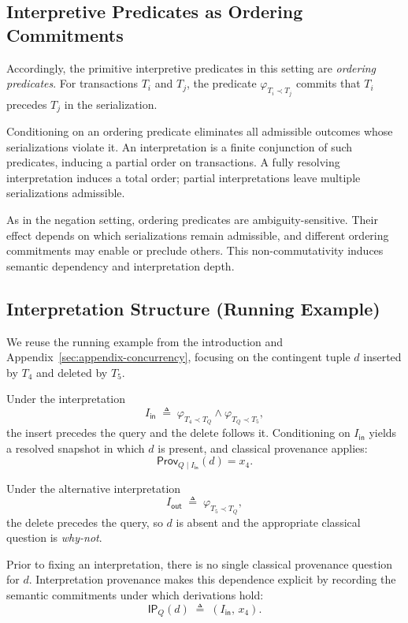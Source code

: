 \documentclass[acmsmall,nonacm]{acmart}
\theoremstyle{remark}
\numberwithin{definition}{section}
\numberwithin{theorem}{section}
\numberwithin{lemma}{section}
\numberwithin{corollary}{section}
\numberwithin{remark}{section}
\numberwithin{example}{section}
\numberwithin{observation}{section}
\numberwithin{assumption}{section}
\newcommand{\Prov}{\mathsf{Prov}}
\begin{document}
\subsection{Interpretive Predicates as Ordering Commitments}

Accordingly, the primitive interpretive predicates in this setting are
\emph{ordering predicates}.
For transactions $T_i$ and $T_j$, the predicate
$\varphi_{T_i \prec T_j}$ commits that $T_i$ precedes $T_j$ in the serialization.

Conditioning on an ordering predicate eliminates all admissible outcomes whose
serializations violate it.
An interpretation is a finite conjunction of such predicates, inducing a partial
order on transactions.
A fully resolving interpretation induces a total order; partial interpretations
leave multiple serializations admissible.

As in the negation setting, ordering predicates are ambiguity-sensitive.
Their effect depends on which serializations remain admissible, and different
ordering commitments may enable or preclude others.
This non-commutativity induces semantic dependency and interpretation depth.

\subsection{Interpretation Structure (Running Example)}

We reuse the running example from the introduction and
Appendix~\ref{sec:appendix-concurrency}, focusing on the contingent tuple $d$
inserted by $T_4$ and deleted by $T_5$.

Under the interpretation
\[
  I_{\mathsf{in}} \;\triangleq\;
  \varphi_{T_4 \prec T_Q} \wedge \varphi_{T_Q \prec T_5},
\]
the insert precedes the query and the delete follows it.
Conditioning on $I_{\mathsf{in}}$ yields a resolved snapshot in which $d$ is
present, and classical provenance applies:
\[
  \Prov_{Q \mid I_{\mathsf{in}}}(d)=x_4.
\]

Under the alternative interpretation
\[
  I_{\mathsf{out}} \;\triangleq\; \varphi_{T_5 \prec T_Q},
\]
the delete precedes the query, so $d$ is absent and the appropriate classical
question is \emph{why-not}.

Prior to fixing an interpretation, there is no single classical provenance
question for $d$.
Interpretation provenance makes this dependence explicit by recording the semantic
commitments under which derivations hold:
\[
  \mathsf{IP}_Q(d) \;\triangleq\; (I_{\mathsf{in}},\, x_4).
\]
\end{document}
